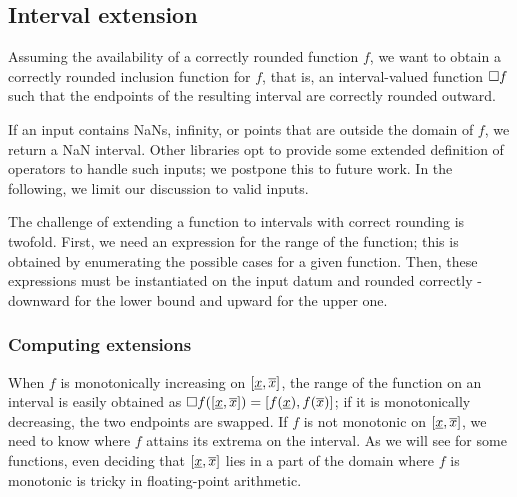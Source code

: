 \subsection{Interval extension}
Assuming the availability of a correctly rounded function $f$, we want to obtain a correctly rounded inclusion function for $f$, that is, an interval-valued function $\Box f$ such that the endpoints of the resulting interval are correctly rounded outward.


If an input contains NaNs, infinity, or points that are outside the domain of $f$, we return a NaN interval.
Other libraries opt to provide some extended definition of operators to handle such inputs; we postpone this to future work.
In the following, we limit our discussion to valid inputs.

The challenge of extending a function to intervals with correct rounding is twofold.
First, we need an expression for the range of the function; this is obtained by enumerating the possible cases for a given function.
Then, these expressions must be instantiated on the input datum and rounded correctly - downward for the lower bound and upward for the upper one.


\subsubsection{Computing extensions}
When $f$ is monotonically increasing on $[\underline{x}, \overline{x}]$, the range of the function on an interval is easily obtained as $\Box f([\underline{x}, \overline{x}]) = [f(\underline{x}), f(\overline{x})]$; if it is monotonically decreasing, the two endpoints are swapped.
If $f$ is not monotonic on $[\underline{x}, \overline{x}]$, we need to know where $f$ attains its extrema on the interval. As we will see for some functions, even deciding that $[\underline{x}, \overline{x}]$ lies in a part of the domain where $f$ is monotonic is tricky in floating-point arithmetic.

